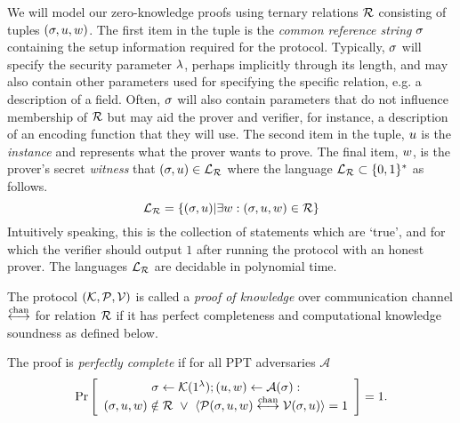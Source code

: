 We will model our zero-knowledge proofs using ternary relations $\mathcal{R}$ consisting of tuples $(\mathsf{\sigma}, u,w)$. The first item in the tuple is the \emph{common reference string} $\mathsf{\sigma}$ containing the setup information required for the protocol. Typically, $\mathsf{\sigma}$ will specify the security parameter $\lambda$, perhaps implicitly through its length, and may also contain other parameters used for specifying the specific relation, e.g. a description of a field. Often, $\mathsf{\sigma}$ will also contain parameters that do not influence membership of $\mathcal{R}$ but may aid the prover and verifier, for instance, a description of an encoding function that they will use. The second item in the tuple, $u$ is the \emph{instance} and represents what the prover wants to prove. The final item, $w$, is the prover's secret \emph{witness} that $(\mathsf{\sigma},u)\in\mathcal{L}_{\mathcal{R}}$ where the language $\mathcal{L}_{\mathcal{R}} \subset \{0,1\}^*$ as follows.
\[ \mathcal{L}_{\mathcal{R}}=\{(\mathsf{\sigma},u)|\exists w: (\mathsf{\sigma},u,w)\in \mathcal{R}\} \]
Intuitively speaking, this is the collection of statements which are `true', and for which the verifier should output $1$ after running the protocol with an honest prover. The languages $\mathcal{L}_{\mathcal{R}}$ are decidable in polynomial time.

The protocol $(\mathcal{K},\mathcal{P},\mathcal{V})$ is called a \emph{proof of knowledge} over communication channel $\overset{\textnormal{chan}}{\longleftrightarrow}$ for relation $\mathcal{R}$ if it has perfect completeness and computational knowledge soundness as defined below.

\begin{definition}
The proof is \emph{perfectly complete} if for all PPT adversaries $\mathcal{A}$
$$\Pr \left[ \begin{array}{c} \mathsf{\sigma}\gets \mathcal{K}(1^{\lambda}); (u,w) \leftarrow \mathcal{A}(\mathsf{\sigma}): \\
(\mathsf{\sigma},u,w)\notin \mathcal{R} ~\vee~ \langle \mathcal{P}(\mathsf{\sigma},u,w)\overset{\textnormal{chan}}{\longleftrightarrow}\mathcal{V}(\mathsf{\sigma},u)\rangle=1 \end{array}\right] =1.$$
\end{definition}

